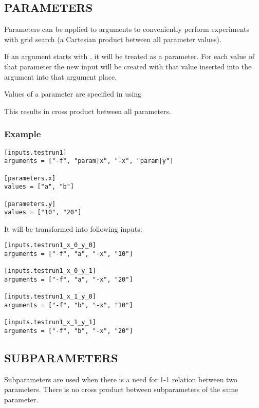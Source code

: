 \documentclass[a4paper,english]{article}
\begin{document}
\begin{adjustwidth}{18pt}{0pt}
      \subsection{PARAMETERS}

          Parameters can be applied to arguments to conveniently perform experiments with grid search
          (a Cartesian product between all parameter values).

          If an argument starts with , it will be treated as a parameter.
          For each value of that parameter the new input will be created with that value inserted into the argument
          into that argument place.

          Values of a parameter are specified in  using 

          This results in cross product between all parameters.

          \subsubsection{Example}

              \begin{verbatim}
[inputs.testrun1]
arguments = ["-f", "param|x", "-x", "param|y"]

[parameters.x]
values = ["a", "b"]

[parameters.y]
values = ["10", "20"]
        \end{verbatim}
                It will be transformed into following inputs:

        \begin{verbatim}
[inputs.testrun1_x_0_y_0]
arguments = ["-f", "a", "-x", "10"]

[inputs.testrun1_x_0_y_1]
arguments = ["-f", "a", "-x", "20"]

[inputs.testrun1_x_1_y_0]
arguments = ["-f", "b", "-x", "10"]

[inputs.testrun1_x_1_y_1]
arguments = ["-f", "b", "-x", "20"]
            \end{verbatim}

    \subsection{SUBPARAMETERS}

        Subparameters are used when there is a need for 1-1 relation between two parameters.
        There is no cross product between subparameters of the same parameter.


\end{adjustwidth}
\end{document}
